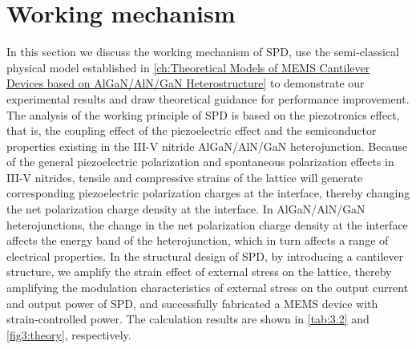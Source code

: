 \section{Working mechanism}
\label{sec:Working mechanism chapter3}

In this section we discuss the working mechanism  of SPD, use the semi-classical physical model established in \autoref{ch:Theoretical Models of MEMS Cantilever Devices based on AlGaN/AlN/GaN Heterostructure} to demonstrate our experimental results and draw theoretical guidance for performance improvement. The analysis of the working principle of SPD is based on the piezotronics  effect, that is, the coupling effect of the piezoelectric effect  and the semiconductor properties existing in the III-V nitride AlGaN/AlN/GaN  heterojunction. Because of the general piezoelectric polarization  and spontaneous  polarization effects in III-V nitrides, tensile and compressive strains of the lattice  will generate corresponding piezoelectric polarization charges  at the  interface, thereby changing the net polarization charge density at the  interface. In AlGaN/AlN/GaN heterojunctions, the change in the net polarization charge density at the interface affects the energy band of the heterojunction, which in turn affects a range of electrical properties. In the structural design of SPD, by introducing a cantilever  structure, we amplify the strain effect of external stress on the lattice, thereby amplifying the modulation  characteristics of external stress on the output current  and output power  of  SPD, and successfully fabricated a MEMS device with strain-controlled power. The calculation results are shown in \autoref{tab:3.2} and \autoref{fig3:theory}, respectively.

\begin{table}[H]
\renewcommand\arraystretch{1.2}
\centering
\caption[The calculated result for $n_{2deg}$-strain relationship under the external force]{The calculated result for $n_{2deg}$-strain relationship under the external force}
\label{tab:3.2}
\end{table}

